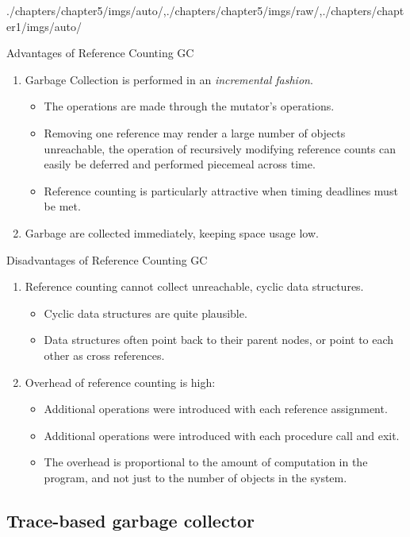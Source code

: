 \begin{graphicspathcontext}{{./chapters/chapter5/imgs/auto/},{./chapters/chapter5/imgs/raw/},{./chapters/chapter1/imgs/auto/}}
\begin{bibunit}[apalike]
\begin{frame}[background=6]{Advantages of Reference Counting GC}
	\begin{enumerate}
		\item Garbage Collection is performed in an \emph{incremental fashion}.
		\begin{itemize}
			\item The operations are made through the mutator's operations.
			\item Removing one reference may render a large number of objects unreachable, the operation of recursively modifying reference counts can easily be deferred and performed piecemeal across time.
			\item Reference counting is particularly attractive when timing deadlines must be met.
		\end{itemize}
		\vfill
		\item Garbage are collected immediately, keeping space usage low.
	\end{enumerate}
\end{frame}

\begin{frame}[background=9]{Disadvantages of Reference Counting GC}
	\begin{enumerate}
		\item Reference counting cannot collect unreachable, cyclic data structures.
		\begin{itemize}
			\item Cyclic data structures are quite plausible.
			\item Data structures often point back to their parent nodes, or point to each other as cross references.
		\end{itemize}
		\vfill
		\item Overhead of reference counting is high:
		\begin{itemize}
			\item Additional operations were introduced with each reference assignment.
			\item Additional operations were introduced with each procedure call and exit.
			\item The overhead is proportional to the amount of computation in the program, and not just to the number of objects in the system.
		\end{itemize}
	\end{enumerate}
\end{frame}

\subsection{Trace-based garbage collector}
\subsectiontableofcontentslide


\end{bibunit}
\end{graphicspathcontext}
